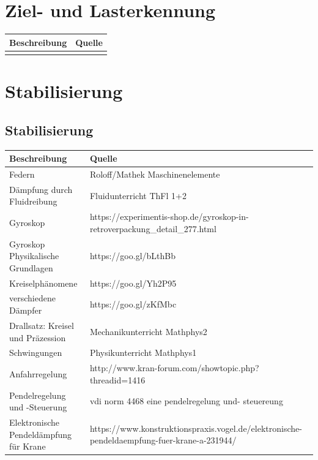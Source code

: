 \documentclass[a4paper]{report}
\begin{document}
\section{Ziel- und Lasterkennung}

\vspace{1em}
\noindent
\begin{tabular}{|l|l|}
	\hline
	\textbf{Beschreibung} & \textbf{Quelle} \\
	\hline
	&  \\
	\hline
\end{tabular}

\section{Stabilisierung}

\subsection{Stabilisierung}

\vspace{1em}
\noindent
\begin{tabular}{|p{}|p{}|}
	\hline 
	\textbf{Beschreibung} & \textbf{Quelle} \\
	\hline
	Federn & Roloff/Mathek Maschinenelemente \\
	\hline
	Dämpfung durch Fluidreibung & Fluidunterricht ThFl 1+2 \\
	\hline
	Gyroskop & https://experimentis-shop.de/gyroskop-in-retroverpackung\_detail\_277.html \\
	\hline
	Gyroskop Physikalische Grundlagen & https://goo.gl/bLthBb \\
	\hline
	Kreiselphänomene & https://goo.gl/Yh2P95 \\
	\hline
	verschiedene Dämpfer & https://goo.gl/zKfMbc \\
	\hline
	Drallsatz: Kreisel und Präzession & Mechanikunterricht Mathphys2 \\
	\hline
	Schwingungen & Physikunterricht Mathphys1 \\
	\hline
	Anfahrregelung & http://www.kran-forum.com/showtopic.php?threadid=1416 \\
	\hline
	Pendelregelung und -Steuerung & vdi norm 4468 eine pendelregelung und- steuereung \\
	\hline
	Elektronische Pendeldämpfung für Krane & https://www.konstruktionspraxis.vogel.de/elektronische-pendeldaempfung-fuer-krane-a-231944/ \\
	\hline
\end{tabular}
\end{document}
